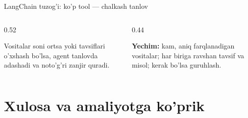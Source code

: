 \documentclass[aspectratio=169,11pt]{beamer}
\begin{document}
\begin{frame}{LangChain tuzog'i: ko'p tool --- chalkash tanlov}
  \begin{columns}[T]
    \begin{column}{0.52\textwidth}
      \begin{tcolorbox}[warnbox,title={Juda ko'p yoki o'xshash tool}]
        \small
        Vositalar soni ortsa yoki tavsiflari o'xshash bo'lsa, agent tanlovda
        adashadi va noto'g'ri zanjir quradi.
      \end{tcolorbox}
    \end{column}
    \begin{column}{0.44\textwidth}
      \begin{tcolorbox}[okbox,top=2pt,bottom=2pt]
        \footnotesize
        \textbf{Yechim:} kam, aniq farqlanadigan vositalar; har biriga ravshan
        tavsif va misol; kerak bo'lsa guruhlash.
      \end{tcolorbox}
    \end{column}
  \end{columns}
\end{frame}

\section[Xulosa]{Xulosa va amaliyotga ko'prik}
\end{document}
